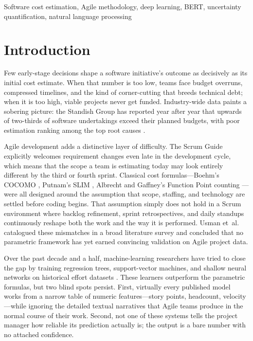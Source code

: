 \documentclass[conference]{IEEEtran}
\begin{document}
\begin{IEEEkeywords}
Software cost estimation, Agile methodology, deep learning, BERT, uncertainty quantification, natural language processing
\end{IEEEkeywords}

\section{Introduction}

Few early-stage decisions shape a software initiative's outcome as decisively as its initial cost estimate. When that number is too low, teams face budget overruns, compressed timelines, and the kind of corner-cutting that breeds technical debt; when it is too high, viable projects never get funded. Industry-wide data paints a sobering picture: the Standish Group has reported year after year that upwards of two-thirds of software undertakings exceed their planned budgets, with poor estimation ranking among the top root causes \cite{standish2020}.

Agile development adds a distinctive layer of difficulty. The Scrum Guide \cite{schwaber2020} explicitly welcomes requirement changes even late in the development cycle, which means that the scope a team is estimating today may look entirely different by the third or fourth sprint. Classical cost formulas---Boehm's COCOMO \cite{boehm1981}, Putnam's SLIM \cite{putnam1978}, Albrecht and Gaffney's Function Point counting \cite{albrecht1979}---were all designed around the assumption that scope, staffing, and technology are settled before coding begins. That assumption simply does not hold in a Scrum environment where backlog refinement, sprint retrospectives, and daily standups continuously reshape both the work and the way it is performed. Usman et~al. \cite{usman2014} catalogued these mismatches in a broad literature survey and concluded that no parametric framework has yet earned convincing validation on Agile project data.

Over the past decade and a half, machine-learning researchers have tried to close the gap by training regression trees, support-vector machines, and shallow neural networks on historical effort datasets \cite{wen2012, sarro2016}. These learners outperform the parametric formulas, but two blind spots persist. First, virtually every published model works from a narrow table of numeric features---story points, headcount, velocity---while ignoring the detailed textual narratives that Agile teams produce in the normal course of their work. Second, not one of these systems tells the project manager how reliable its prediction actually is; the output is a bare number with no attached confidence.
\end{document}
